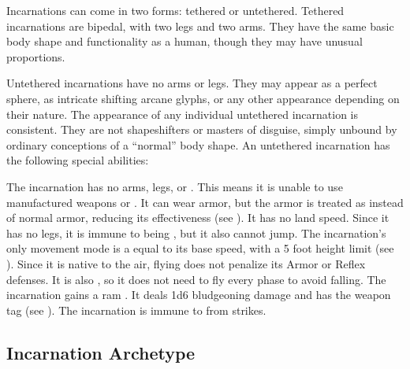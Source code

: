 Incarnations can come in two forms: tethered or untethered.
Tethered incarnations are bipedal, with two legs and two arms.
They have the same basic body shape and functionality as a human, though they may have unusual proportions.

Untethered incarnations have no arms or legs.
They may appear as a perfect sphere, as intricate shifting arcane glyphs, or any other appearance depending on their nature.
The appearance of any individual untethered incarnation is consistent.
They are not shapeshifters or masters of disguise, simply unbound by ordinary conceptions of a ``normal'' body shape.
An untethered incarnation has the following special abilities:
\begin{raggeditemize}
	 The incarnation has no arms, legs, or .
	This means it is unable to use manufactured weapons or .
	It can wear armor, but the armor is treated as  instead of normal armor, reducing its effectiveness (see ).
	It has no land speed.
	Since it has no legs, it is immune to being \prone, but it also cannot jump.
	 The incarnation's only movement mode is a  equal to its base speed, with a 5 foot height limit (see ).
	Since it is native to the air, flying does not penalize its Armor or Reflex defenses.
	It is also , so it does not need to fly every phase to avoid falling.
	 The incarnation gains a ram .
	It deals 1d6 bludgeoning damage and has the  weapon tag (see ).
	 The incarnation is immune to  from strikes.
\end{raggeditemize}

\subsection{Incarnation Archetype}

